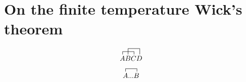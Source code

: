 \chapter{On the finite temperature Wick's theorem}
\label{ap:wick}

\pagebreak

\begin{equation}
\contraction{}{A}{B}{C}
\contraction[2ex]{A}{B}{C}{D}
ABCD
\end{equation}



$$
\contraction{}{A}{...}{B}
%
A...B
$$